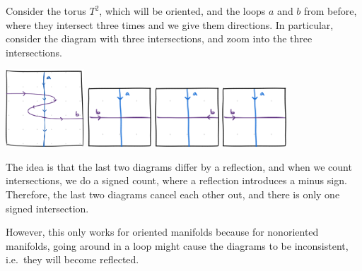 \documentclass{standalone}
\begin{document}
Consider the torus \(T^2\), which will be oriented,
and the loops \(a\) and \(b\) from before,
where they intersect three times and we give them directions.
In particular, consider the diagram with three intersections,
and zoom into the three intersections.
\begin{center}
  \includegraphics[width=0.22\textwidth, align=c]{18_905-201120-7.png}
  \qquad
  \includegraphics[width=0.18\textwidth, align=c]{18_905-201120-8.png}
  \qquad
  \includegraphics[width=0.18\textwidth, align=c]{18_905-201120-9.png}
  \qquad
  \includegraphics[width=0.18\textwidth, align=c]{18_905-201120-8.png}
\end{center}
The idea is that the last two diagrams differ by a reflection,
and when we count intersections, we do a signed count,
where a reflection introduces a minus sign.
Therefore, the last two diagrams cancel each other out,
and there is only one signed intersection.

However, this only works for oriented manifolds because
for nonoriented manifolds, going around in a loop might cause
the diagrams to be inconsistent, i.e.\ they will become reflected.
\end{document}
